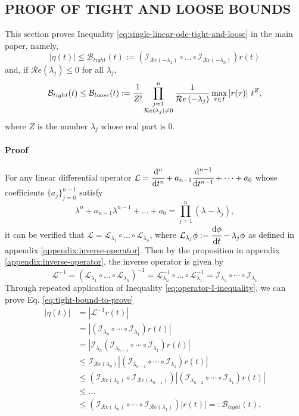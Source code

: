 \documentclass[accepted]{uai2023}
\newcommand{\dt}[1]{\cfrac{\mathrm{d} #1}{\mathrm{d} t}}
\newcommand{\dnt}[2]{\cfrac{\mathrm{d}^{#1} #2}{\mathrm{d} t^{#1}}}
\newcommand{\Err}{\eta}
\newcommand{\Bound}{\mathcal{B}}
\renewcommand{\L}{\mathcal{L}}
\newcommand{\I}{\mathcal{I}}
\renewcommand{\Re}[1]{\mathcal{R}e\left(#1\right)}
\begin{document}
\subsection{PROOF OF TIGHT AND LOOSE BOUNDS}
This section proves Inequality \ref{eq:single-linear-ode-tight-and-loose} in the main paper, namely,
\begin{equation}\label{eq:tight-bound-to-prove}
    |\Err(t)| \leq \Bound_{tight}(t) :=\left(\I_{\Re{-\lambda_1}}\circ\dots\circ\I_{\Re{-\lambda_n}}\right)r(t)
\end{equation}
and, if $\Re{\lambda_j} \leq 0$ for all $\lambda_j$, 
\begin{equation}\label{eq:loose-bound-to-prove}
    \Bound_{tight}(t) \leq \Bound_{loose}(t) := \cfrac{1}{Z!} \prod_{\substack{j=1\\ \Re{\lambda_j} \neq 0}}^n \frac{1}{\Re{-\lambda_j}} \max_{\tau\in I}\left|r(\tau)\right|\, t^{Z},
\end{equation}
where $Z$ is the number $\lambda_j$ whose real part is $0$.

\paragraph{Proof} For any linear differential operator $\L=\dnt{n}{} + a_{n-1}\dnt{n-1}{}+\dots+a_0$ whose coefficients $\{a_j\}_{j=0}^{n-1}$ satisfy 
\[
    \lambda^n + a_{n-1}\lambda^{n-1} + \dots +a_0 = \prod_{j=1}^{n} \left(\lambda - \lambda_j\right),
\]
it can be verified that $\L = \L_{\lambda_1} \circ\dots \circ \L_{\lambda_n}$, where $\L_{\lambda_j}\phi := \dt{\phi}-\lambda_j\phi$ as defined in appendix \ref{appendix:inverse-operator}. Then by the proposition in appendix \ref{appendix:inverse-operator}, the inverse operator is given by
\begin{equation}
    \L^{-1} = \left(\L_{\lambda_1} \circ\dots \circ \L_{\lambda_n}\right)^{-1} = \L_{\lambda_n}^{-1} \circ\dots \circ \L_{\lambda_1}^{-1} = \I_{\lambda_n} \circ\cdots\circ\I_{\lambda_1}
\end{equation}
Through repeated application of Inequality \ref{eq:operator-I-inequality}, we can prove Eq. \ref{eq:tight-bound-to-prove}
\begin{align}
    \left|\Err(t)\right| &= \left| \L^{-1} r(t) \right| \\
    &=\left|\left(\I_{\lambda_n} \circ\cdots\circ\I_{\lambda_1}\right) r(t)\right| \\
    &=\left|\I_{\lambda_n}\left(\I_{\lambda_{n-1}} \circ\cdots\circ\I_{\lambda_1}\right) r(t)\right| \\
    &\leq \I_{\Re{\lambda_n}}\left|\left(\I_{\lambda_{n-1}} \circ\cdots\circ\I_{\lambda_1}\right) r(t)\right| \\
    &\leq \left(\I_{\Re{\lambda_n}}\circ \I_{\Re{\lambda_{n-1}}}\right)\left|\left(\I_{\lambda_{n-2}} \circ\cdots\circ\I_{\lambda_1}\right) r(t)\right| \\
    &\leq \dots \nonumber \\
    &\leq \left(\I_{\Re{\lambda_n}}\circ \cdots \circ\I_{\Re{\lambda_{1}}}\right)\left|r(t)\right| =: \Bound_{tight}(t).
\end{align}
\end{document}
